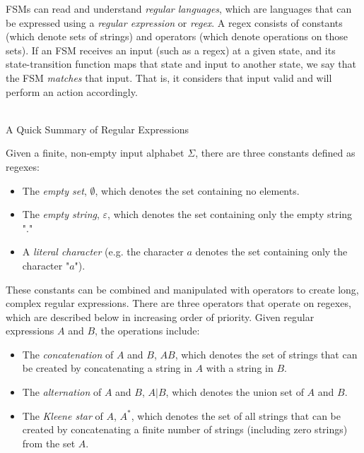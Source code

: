 FSMs can read and understand \textit{regular languages}, which are languages that can be expressed using a \textit{regular expression} or \textit{regex}. A regex consists of constants (which denote sets of strings) and operators (which denote operations on those sets). If an FSM receives an input (such as a regex) at a given state, and its state-transition function maps that state and input to another state, we say that the FSM \textit{matches} that input. That is, it considers that input valid and will perform an action accordingly. \\\\

\begin{bluebox}{A Quick Summary of Regular Expressions}

    Given a finite, non-empty input alphabet $\Sigma$, there are three constants defined as regexes:
        
    \begin{itemize}
        \item The \textit{empty set}, $\emptyset$, which denotes the set containing no elements.
        \item The \textit{empty string}, $\varepsilon$, which denotes the set containing only the empty string "."
        \item A \textit{literal character} (e.g. the character $a$ denotes the set containing only the character "$a$").
    \end{itemize}
        
    These constants can be combined and manipulated with operators to create long, complex regular expressions. There are three operators that operate on regexes, which are described below in increasing order of priority. Given regular expressions $A$ and $B$, the operations include:
        
    \begin{itemize}
        \item The \textit{concatenation} of $A$ and $B$, $AB$, which denotes the set of strings that can be created by concatenating a string in $A$ with a string in $B$.
        \item The \textit{alternation} of $A$ and $B$, $A|B$, which denotes the union set of $A$ and $B$.
        \item The \textit{Kleene star} of $A$, $A^*$, which denotes the set of all strings that can be created by concatenating a finite number of strings (including zero strings) from the set $A$.
    \end{itemize}
        

\end{bluebox}
